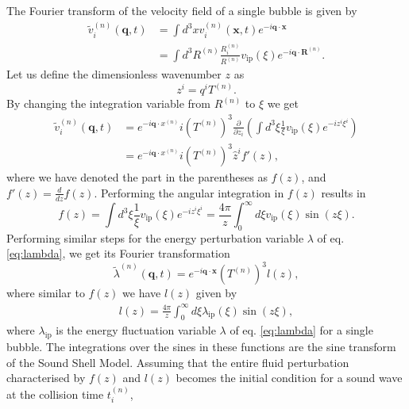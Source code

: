 The Fourier transform of the velocity field of a single bubble is given by
\cite[eq. 4.3]{hindmarsh_gw_pt_2019}
\begin{align}
\tilde{v}_i^{(n)} (\mathbf{q},t)
&= \int d^3 x v_i^{(n)} (\mathbf{x},t) e^{-i \mathbf{q} \cdot \mathbf{x}} \\
&= \int d^3 R^{(n)} \frac{R_i^{(n)}}{R^{(n)}} v_\text{ip}(\xi) e^{-i \mathbf{q} \cdot \mathbf{R}^{(n)}}.
\end{align}
Let us define the dimensionless wavenumber $z$ as
\begin{equation}
z^i = q^i T^{(n)}.
\end{equation}
By changing the integration variable from $R^{(n)}$ to $\xi$ we get
\cite[eq. 4.4, eq. 4.6]{hindmarsh_gw_pt_2019}
\begin{align}
\tilde{v}_i^{(n)} (\mathbf{q},t)
&= e^{-i \mathbf{q} \cdot x^{(n)}} i (T^{(n)})^3 \frac{\partial}{\partial z_i} \left(
\int d^3 \xi \frac{1}{\xi} v_\text{ip}(\xi) e^{-i z^i \xi^i} \right) \\
&= e^{-i \mathbf{q} \cdot x^{(n)}} i (T^{(n)})^3 \hat{z}^i f'(z),
\end{align}
where we have denoted the part in the parentheses as $f(z)$, and $f'(z) = \frac{d}{dz}f(z)$.
Performing the angular integration in $f(z)$ results in
\cite[eq. 4.5]{hindmarsh_gw_pt_2019}
\begin{equation}
f(z) = \int d^3\xi \frac{1}{\xi} v_\text{ip}(\xi) e^{-iz^i \xi^i}
= \frac{4\pi}{z} \int_0^\infty d\xi v_\text{ip}(\xi) \sin(z\xi).
\label{eq:ssm_f}
\end{equation}
Performing similar steps for the energy perturbation variable $\lambda$ of eq. \eqref{eq:lambda}, we get its Fourier transformation
\begin{equation}
\tilde{\lambda}^{(n)}(\mathbf{q},t) = e^{-i \mathbf{q} \cdot \mathbf{x}} (T^{(n)})^3 l(z),
\end{equation}
where similar to $f(z)$ we have $l(z)$ given by
\cite[eq. 4.8]{hindmarsh_gw_pt_2019}
\begin{align}
l(z) = \frac{4 \pi}{z} \int_0^\infty d\xi \lambda_\text{ip}(\xi) \sin(z\xi),
\label{eq:ssm_l}
\end{align}
where $\lambda_\text{ip}$ is the energy fluctuation variable $\lambda$ of eq. \eqref{eq:lambda} for a single bubble.
The integrations over the sines in these functions are the sine transform of the Sound Shell Model.
Assuming that the entire fluid perturbation characterised by $f(z)$ and $l(z)$ becomes the initial condition for a sound wave at the collision time $t_i^{(n)}$,

